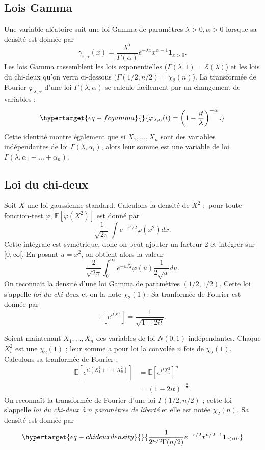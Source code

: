 \documentclass[
  10,
  letterpaper,
  DIV=11,
  numbers=noendperiod]{scrreport}
\theoremstyle{plain}
\theoremstyle{definition}
\theoremstyle{plain}
\theoremstyle{definition}
\theoremstyle{definition}
\theoremstyle{plain}
\theoremstyle{remark}
\begin{document}
\hypertarget{lois-gamma-1}{%
\subsection{Lois Gamma}\label{lois-gamma-1}}

Une variable aléatoire suit une loi Gamma de paramètres
\(\lambda>0, \alpha>0\) lorsque sa densité est donnée par
\[\gamma_{r,\alpha}(x) =  \frac{\lambda^\alpha}{\Gamma(\alpha)}e^{-\lambda x}x^{\alpha -1}\mathbf{1}_{x>0}.\]
Les lois Gamma rassemblent les lois exponentielles
(\(\Gamma(\lambda, 1) = \mathscr{E}(\lambda)\)) et les lois du chi-deux
qu'on verra ci-dessous \((\Gamma(1/2, n/2) = \chi_2(n)\)). La
transformée de Fourier \(\varphi_{\lambda, \alpha}\) d'une loi
\(\Gamma(\lambda, \alpha)\) se calcule facilement par un changement de
variables :
\begin{equation}\protect\hypertarget{eq-fcgamma}{}{\varphi_{\lambda, \alpha}(t) = \left(1 - \frac{it}{\lambda}\right)^{-\alpha}.}\label{eq-fcgamma}\end{equation}
Cette identité montre également que si \(X_1, \dotsc, X_n\) sont des
variables indépendantes de loi \(\Gamma(\lambda, \alpha_i)\), alors leur
somme est une variable de loi
\(\Gamma(\lambda, \alpha_1 + \dotsc + \alpha_n)\).

\hypertarget{sec-chideux}{%
\subsection{Loi du chi-deux}\label{sec-chideux}}

Soit \(X\) une loi gaussienne standard. Calculons la densité de \(X^2\)
;~pour toute fonction-test \(\varphi\), \(\mathbb{E}[\varphi(X^2)]\) est
donné par \[\frac{1}{\sqrt{2\pi}}\int e^{-x^2/2}\varphi(x^2)dx.\] Cette
intégrale est symétrique, donc on peut ajouter un facteur 2 et intégrer
sur \([0,\infty[\). En posant \(u=x^2\), on obtient alors la valeur
\[ \frac{2}{\sqrt{2\pi}}\int_0^\infty e^{-u/2}\varphi(u)\frac{1}{2\sqrt{u}}du.\]
On reconnaît la densité d'une
\href{https://fr.wikipedia.org/wiki/Loi_Gamma}{loi Gamma} de paramètres
\((1/2, 1/2)\). Cette loi s'appelle \emph{loi du chi-deux} et on la note
\(\chi_2(1)\). Sa tranformée de Fourier est donnée par
\[\mathbb{E}[e^{itX^2}] = \frac{1}{\sqrt{1 - 2it}}. \]

Soient maintenant \(X_1,\dotsc, X_n\) des variables de loi \(N(0,1)\)
indépendantes. Chaque \(X_i^2\) est une \(\chi_2(1)\) ; leur somme a
pour loi la convolée \(n\) fois de \(\chi_2(1)\). Calculons sa
tranformée de Fourier :~
\begin{align}\mathbb{E}[e^{it(X_1^2 + \dotsb + X_n^2)}] &= \mathbb{E}[e^{itX_1^2}]^n \\ &= (1-2it)^{-\frac{n}{2}} .\end{align}
On reconnaît la transformée de Fourier d'une loi \(\Gamma(1/2, n/2)\) ;
cette loi s'appelle \emph{loi du chi-deux à \(n\) paramètres de liberté}
et elle est notée \(\chi_2(n)\). Sa densité est donnée par
\begin{equation}\protect\hypertarget{eq-chideuxdensity}{}{ \frac{1}{2^{n/2}\Gamma(n/2)}e^{-x/2}x^{n/2 - 1}\mathbf{1}_{x>0}.}\label{eq-chideuxdensity}\end{equation}
\end{document}

